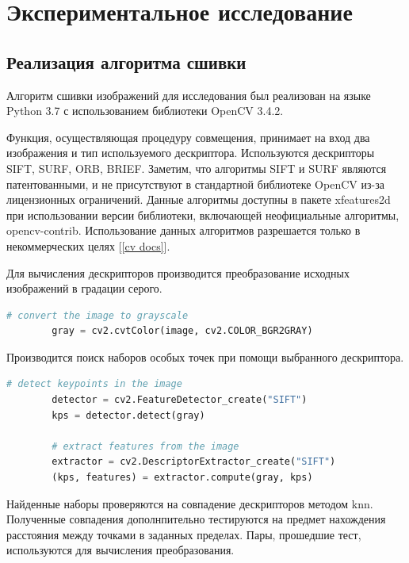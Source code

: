 \section{Экспериментальное исследование}
{
   	\subsection{Реализация алгоритма сшивки}{
   		
   		Алгоритм сшивки изображений для исследования был реализован на языке Python 3.7 с использованием библиотеки OpenCV 3.4.2. 
   		
   		Функция, осуществляющая процедуру совмещения, принимает на вход два изображения и тип используемого дескриптора. 
   		Используются дескрипторы SIFT, SURF, ORB, BRIEF. Заметим, что алгоритмы SIFT и SURF являются патентованными, и не присутствуют в стандартной библиотеке OpenCV из-за лицензионных ограничений. Данные алгоритмы доступны в пакете xfeatures2d при использовании версии библиотеки, включающей неофициальные алгоритмы, opencv-contrib. Использование данных алгоритмов разрешается только в некоммерческих целях [\ref{cv docs}]. 
   		
   		Для вычисления дескрипторов производится преобразование исходных изображений в градации серого.
   		
   		\begin{lstlisting}[frame=single,language=Python,mathescape=true] 
   		# convert the image to grayscale
   		gray = cv2.cvtColor(image, cv2.COLOR_BGR2GRAY)
   		\end{lstlisting}
   		
   		Производится поиск наборов особых точек при помощи выбранного дескриптора.
   	
   		\begin{lstlisting}[frame=single,language=Python,mathescape=true] 
   		# detect keypoints in the image
   		detector = cv2.FeatureDetector_create("SIFT")
   		kps = detector.detect(gray)
   		
   		# extract features from the image
   		extractor = cv2.DescriptorExtractor_create("SIFT")
   		(kps, features) = extractor.compute(gray, kps)
   		\end{lstlisting}
   		
   		Найденные наборы проверяются на совпадение дескрипторов методом knn. Полученные совпадения дополнпительно тестируются на предмет нахождения расстояния между точками в заданных пределах. Пары, прошедшие тест, используются для вычисления преобразования.
   		
}}
